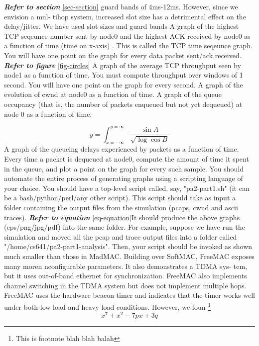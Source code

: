 \documentclass[a4paper,11pt,twocolumn,dvips]{report}
\begin{document}
{\bf\it Refer to section }\ref{sec-section}
guard bands of 4ms-12ms. However, since we envision a mul-
tihop system, increased slot size has a detrimental effect on
the delay/jitter. We have used slot sizes and guard bands
A graph of the highest TCP seqeunce number sent by node0 and the
    highest ACK received by node0 as a function of time (time on x-axis)
    . This is called the TCP time seqeunce graph. You will have one point
    on the graph for every data packet sent/ack received.
   {\bf\it Refer to figure }\ref{fig-circles} A graph of the average TCP throughput seen by node1 as a function of time. You must compute throughput over windows of 1 second. You will have one point on the graph for every second.
    A graph of the evolution of cwnd at node0 as a function of time.
    A graph of the queue occupancy (that is, the number of packets enqueued but not yet dequeued) at node 0 as a function of time.

\begin{equation}
 y= \int_{x=-\infty}^{y=\infty}\frac{\sin A}{\sqrt{\log \cos B}}
\end{equation}    A graph of the queueing delays experienced by packets as a function of time. Every time a packet is dequeued at node0, compute the amount of time it spent in the queue, and plot a point on the graph for every such sample. 
You should automate the entire process of generating graphs using a scripting language of your choice. You should have a top-level script called, say, "pa2-part1.sh" (it can be a bash/python/perl/any other script). This script should take as input a folder containing the output files from the simulation (pcaps, cwnd and ascii traces). {\bf\it Refer to equation }\ref{eq-equation}It should produce the above graphs (eps/png/jpg/pdf) into the same folder. For example, suppose we have run the simulation and moved all the pcap and trace output files into a folder called "/home/cs641/pa2-part1-analysis". Then, your script should be invoked as shown 
much smaller than those in MadMAC.
Building over SoftMAC, FreeMAC  exposes many moren nconfigurable parameters. It also demonstrates a TDMA sys-
tem, but it uses out-of-band ethernet for synchronization.
FreeMAC also implements channel switching in the TDMA
system but does not implement multiple hops. FreeMAC\cite{sample4}
uses the hardware beacon timer and indicates that the timer
works well under both low load and heavy load conditions.
However, we foun
\footnote{This is footnote blah blah balah}
$$x^7+x^2-7px+3q $$




\end{document}
